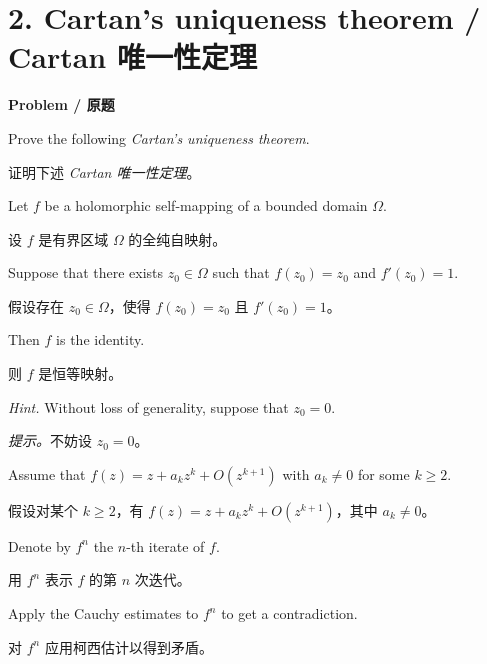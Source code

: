 \documentclass[11pt,a4paper]{ctexart}
\newcommand{\pair}[2]{\par\noindent #1\par\nopagebreak[3]\noindent #2\par}
\newcommand{\heading}[2]{\par\medskip\textbf{#1 / #2}\par\nopagebreak[4]}
\begin{document}
\section*{2. Cartan's uniqueness theorem / Cartan 唯一性定理}
\heading{Problem}{原题}
\pair{Prove the following \emph{Cartan's uniqueness theorem}.}{证明下述 \emph{Cartan 唯一性定理}。}
\pair{Let $f$ be a holomorphic self-mapping of a bounded domain $\Omega$.}{设 $f$ 是有界区域 $\Omega$ 的全纯自映射。}
\pair{Suppose that there exists $z_0\in\Omega$ such that $f(z_0)=z_0$ and $f'(z_0)=1$.}{假设存在 $z_0\in\Omega$，使得 $f(z_0)=z_0$ 且 $f'(z_0)=1$。}
\pair{Then $f$ is the identity.}{则 $f$ 是恒等映射。}
\pair{\emph{Hint.} Without loss of generality, suppose that $z_0=0$.}{\emph{提示。}不妨设 $z_0=0$。}
\pair{Assume that $f(z)=z+a_kz^k+O(z^{k+1})$ with $a_k\ne0$ for some $k\ge2$.}{假设对某个 $k\ge2$，有 $f(z)=z+a_kz^k+O(z^{k+1})$，其中 $a_k\ne0$。}
\pair{Denote by $f^n$ the $n$-th iterate of $f$.}{用 $f^n$ 表示 $f$ 的第 $n$ 次迭代。}
\pair{Apply the Cauchy estimates to $f^n$ to get a contradiction.}{对 $f^n$ 应用柯西估计以得到矛盾。}
\end{document}

